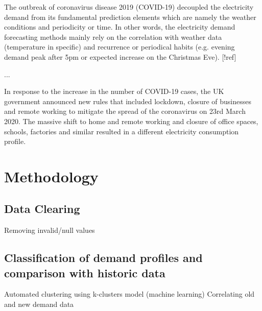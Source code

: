 \documentclass[energies,article,submit,moreauthors,pdftex]{Definitions/mdpi}
\begin{document}
The outbreak of coronavirus disease 2019 (COVID-19) decoupled the electricity demand from its fundamental prediction elements which are namely the weather conditions and periodicity or time. In other words, the electricity demand forecasting methods mainly rely on the correlation with weather data (temperature in specific) and recurrence or periodical habits (e.g. evening demand peak after 5pm or expected increase on the Christmas Eve). [!ref]

...


 In response to the increase in the number of COVID-19 cases, the UK government announced new rules that included lockdown, closure of businesses and remote working to mitigate the spread of the coronavirus on 23rd March 2020. The massive shift to home and remote working and closure of office spaces, schools, factories and similar resulted in a different electricity consumption profile.



 
\section{Methodology}

\subsection{Data Clearing}
Removing invalid/null values

\subsection{Classification of demand profiles and comparison with historic data}
Automated clustering using k-clusters model (machine learning)
Correlating old and new demand data
\end{document}
